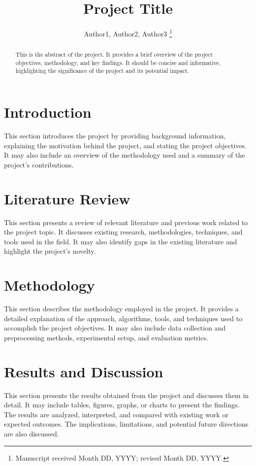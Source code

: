 \documentclass[journal]{IEEEtran}
\title{Project Title}
\author{Author1, Author2, Author3%
	\thanks{Manuscript received Month DD, YYYY; revised Month DD, YYYY.}}
\begin{document}
	
	\maketitle
	
	
	\begin{abstract}
		This is the abstract of the project. It provides a brief overview of the project objectives, methodology, and key findings. It should be concise and informative, highlighting the significance of the project and its potential impact.
	\end{abstract}
	
	\section{Introduction}
	\label{sec:introduction}
	This section introduces the project by providing background information, explaining the motivation behind the project, and stating the project objectives. It may also include an overview of the methodology used and a summary of the project's contributions.
	
	\section{Literature Review}
	\label{sec:literature_review}
	This section presents a review of relevant literature and previous work related to the project topic. It discusses existing research, methodologies, techniques, and tools used in the field. It may also identify gaps in the existing literature and highlight the project's novelty.
	
	\section{Methodology}
	\label{sec:methodology}
	This section describes the methodology employed in the project. It provides a detailed explanation of the approach, algorithms, tools, and techniques used to accomplish the project objectives. It may also include data collection and preprocessing methods, experimental setup, and evaluation metrics.
	
	\section{Results and Discussion}
	\label{sec:results_discussion}
	This section presents the results obtained from the project and discusses them in detail. It may include tables, figures, graphs, or charts to present the findings. The results are analyzed, interpreted, and compared with existing work or expected outcomes. The implications, limitations, and potential future directions are also discussed.
	
\end{document}
